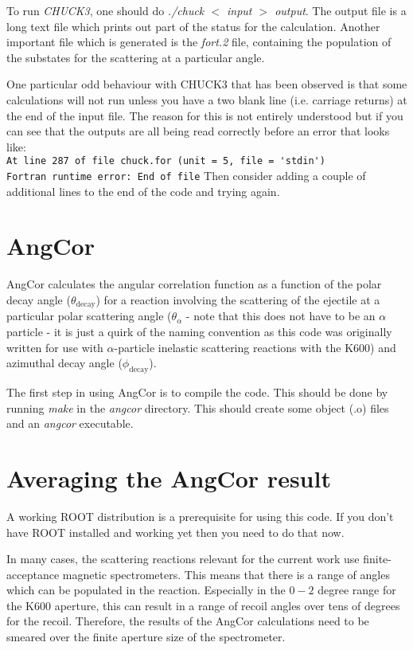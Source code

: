 \documentclass[a4paper,10pt]{article}
\begin{document}
To run {\it CHUCK3}, one should do {\it ./chuck $<$ input $>$ output}. The output file is a long text file which prints out part of the status for the calculation. Another important file which is generated is the {\it fort.2} file, containing the population of the substates for the scattering at a particular angle.

One particular odd behaviour with CHUCK3 that has been observed is that some calculations will not run unless you have a two blank line (i.e. carriage returns) at the end of the input file. The reason for this is not entirely understood but if you can see that the outputs are all being read correctly before an error that looks like:\\ \lstinline!At line 287 of file chuck.for (unit = 5, file = 'stdin')!\\ \lstinline!Fortran runtime error: End of file!
Then consider adding a couple of additional lines to the end of the code and trying again.

\section{AngCor}

AngCor calculates the angular correlation function as a function of the polar decay angle ($\theta_{\mathrm{decay}}$) for a reaction involving the scattering of the ejectile at a particular polar scattering angle ($\theta_{\alpha}$ - note that this does not have to be an $\alpha$ particle - it is just a quirk of the naming convention as this code was originally written for use with $\alpha$-particle inelastic scattering reactions with the K600) and azimuthal decay angle ($\phi_{\mathrm{decay}}$).

The first step in using AngCor is to compile the code. This should be done by running {\it make} in the {\it angcor} directory. This should create some object (.o) files and an {\it angcor} executable.

\section{Averaging the AngCor result}

A working ROOT distribution is a prerequisite for using this code. If you don't have ROOT installed and working yet then you need to do that now.

In many cases, the scattering reactions relevant for the current work use finite-acceptance magnetic spectrometers. This means that there is a range of angles which can be populated in the reaction. Especially in the $0-2$ degree range for the K600 aperture, this can result in a range of recoil angles over tens of degrees for the recoil. Therefore, the results of the AngCor calculations need to be smeared over the finite aperture size of the spectrometer.
\end{document}
